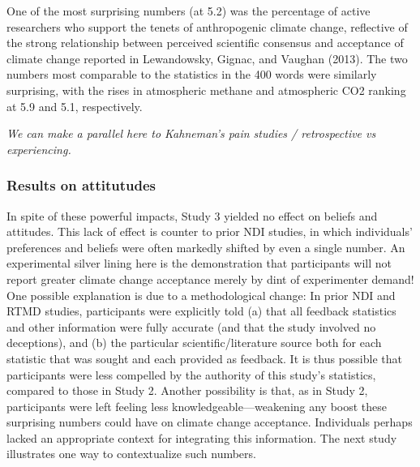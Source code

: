 One of the most surprising numbers (at 5.2) was the percentage of active
researchers who support the tenets of anthropogenic climate change, reflective
of the strong relationship between perceived scientific consensus and acceptance
of climate change reported in Lewandowsky, Gignac, and Vaughan (2013). The two
numbers most comparable to the statistics in the 400 words were similarly
surprising, with the rises in atmospheric methane and atmospheric CO2 ranking at
5.9 and 5.1, respectively.

\emph{We can make a parallel here to Kahneman's pain studies / retrospective vs
experiencing.}

\subsubsection{Results on attitutudes}

In spite of these powerful impacts, Study 3 yielded no effect on beliefs and
attitudes. This lack of effect is counter to prior NDI studies, in which
individuals’ preferences and beliefs were often markedly shifted by even a
single number. An experimental silver lining here is the demonstration that
participants will not report greater climate change acceptance merely by dint of
experimenter demand! One possible explanation is due to a methodological change:
In prior NDI and RTMD studies, participants were explicitly told (a) that all
feedback statistics and other information were fully accurate (and that the
study involved no deceptions), and (b) the particular scientific/literature
source both for each statistic that was sought and each provided as feedback.
It is thus possible that participants were less compelled by the authority of
this study’s statistics, compared to those in Study 2.  Another possibility is
that, as in Study 2, participants were left feeling less knowledgeable—weakening
any boost these surprising numbers could have on climate change acceptance.
Individuals perhaps lacked an appropriate context for integrating this
information. The next study illustrates one way to contextualize such numbers.

